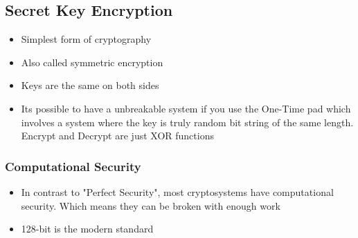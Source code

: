 \documentclass[twoside]{article}
\begin{document}
\subsection{Secret Key Encryption}
\begin{itemize}
\item Simplest form of cryptography
\item Also called symmetric encryption
\item Keys are the same on both sides
\item Its possible to have a unbreakable system if you use the One-Time pad which involves a system where the key is truly random bit string of the same length. Encrypt and Decrypt are just XOR functions 
\end{itemize}

\subsubsection{Computational Security}
\begin{itemize}
\item In contrast to "Perfect Security", most cryptosystems have computational security. Which means they can be broken with enough work 
\item 128-bit is the modern standard
\end{itemize}
\end{document}
